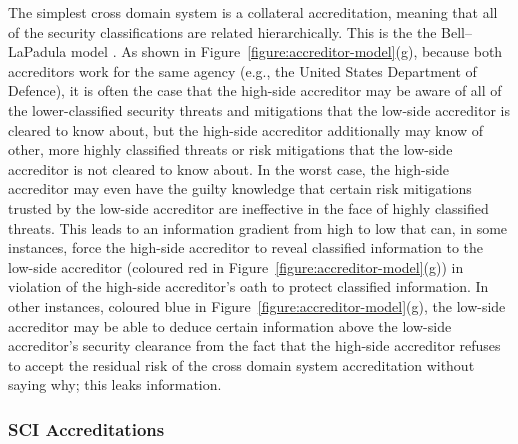 \documentclass[10pt,letterpaper,conference]{IEEEtran}
\begin{document}
The simplest cross domain system is a collateral accreditation, meaning that all of the security
classifications are related hierarchically.  This is the the Bell--LaPadula model \cite{Bell1973}.
As shown in Figure~\ref{figure:accreditor-model}(g), because both
accreditors work for the same agency (e.g., the United States Department of Defence), it is often
the case that the high-side accreditor may be aware of all of the lower-classified security threats
and mitigations that the low-side accreditor is cleared to know about, but the high-side accreditor
additionally may know of other, more highly classified threats or risk mitigations that the
low-side accreditor is not cleared to know about.  In the worst case, the high-side accreditor may
even have the guilty knowledge that certain risk mitigations trusted by the low-side accreditor are
ineffective in the face of highly classified threats.  This leads to an information gradient from
high to low that can, in some instances, force the high-side accreditor to reveal classified
information to the low-side accreditor (coloured red in Figure~\ref{figure:accreditor-model}(g)) in
violation of the high-side accreditor's oath to protect classified information.  In other
instances, coloured blue in Figure~\ref{figure:accreditor-model}(g), the low-side accreditor may be
able to deduce certain information above the low-side accreditor's security clearance from the fact
that the high-side accreditor refuses to accept the residual risk of the cross domain system
accreditation without saying why; this leaks information.

\subsubsection{SCI Accreditations}
\end{document}
